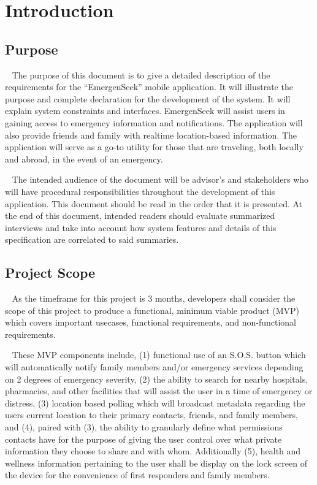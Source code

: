 \documentclass{scrreprt}
\begin{document}
\chapter{Introduction}


\section{Purpose}
\par ~ The purpose of this document is to give a detailed description of the requirements for the ``EmergenSeek'' mobile application. It will illustrate the purpose and complete declaration for the development of the system. It will explain system constraints and interfaces. EmergenSeek will assist users in gaining access to emergency information and notifications. The application will also provide friends and family with realtime location-based information. The application will serve as a go-to utility for those that are traveling, both locally and abroad, in the event of an emergency.
\par ~ The intended audience of the document will be advisor's and stakeholders who will have procedural responsibilities throughout the development of this application. This document should be read in the order that it is presented. At the end of this document, intended readers should evaluate summarized interviews and take into account how system features and details of this specification are correlated to said summaries.


\section{Project Scope}
\par ~ As the timeframe for this project is 3 months, developers shall consider the scope of this project to produce a functional, minimum viable product (MVP) which covers important usecases, functional requirements, and non-functional requirements. 

\par ~ These MVP components include, (1) functional use of an S.O.S. button which will automatically notify family members and/or emergency services depending on 2 degrees of emergency severity, (2) the ability to search for nearby hospitals, pharmacies, and other facilities that will assist the user in a time of emergency or distress, (3) location based polling which will broadcast metadata regarding the users current location to their primary contacts, friends, and family members, and (4), paired with (3), the ability to granularly define what permissions contacts have for the purpose of giving the user control over what private information they choose to share and with whom. Additionally (5), health and wellness information pertaining to the user shall be display on the lock screen of the device for the convenience of first responders and family members.
\end{document}
